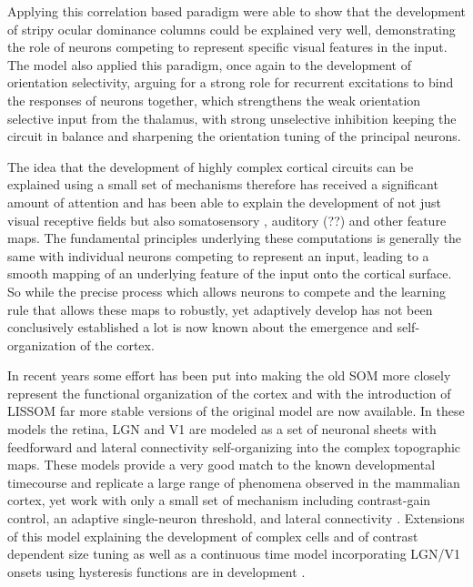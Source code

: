 Applying this correlation based paradigm \cite{Miller1989} were able
to show that the development of stripy ocular dominance columns could
be explained very well, demonstrating the role of neurons competing to
represent specific visual features in the input. The \cite{Sur1995}
model also applied this paradigm, once again to the development of
orientation selectivity, arguing for a strong role for recurrent
excitations to bind the responses of neurons together, which
strengthens the weak orientation selective input from the thalamus,
with strong unselective inhibition keeping the circuit in balance and
sharpening the orientation tuning of the principal neurons.

The idea that the development of highly complex cortical circuits can
be explained using a small set of mechanisms therefore has received a
significant amount of attention and has been able to explain the
development of not just visual receptive fields but also somatosensory
\citep{Wilson2010}, auditory (??) and other feature maps. The
fundamental principles underlying these computations is generally the
same with individual neurons competing to represent an input, leading
to a smooth mapping of an underlying feature of the input onto the
cortical surface. So while the precise process which allows neurons to
compete and the learning rule that allows these maps to robustly, yet
adaptively develop has not been conclusively established a lot is now
known about the emergence and self-organization of the cortex.

In recent years some effort has been put into making the old SOM more
closely represent the functional organization of the cortex and with
the introduction of LISSOM \citep{Bednar2003} far more stable versions
of the original model are now available. In these models the retina,
LGN and V1 are modeled as a set of neuronal sheets with feedforward
and lateral connectivity self-organizing into the complex topographic
maps. These models provide a very good match to the known
developmental timecourse and replicate a large range of phenomena
observed in the mammalian cortex, yet work with only a small set of
mechanism including contrast-gain control, an adaptive single-neuron
threshold, and lateral connectivity \citep{Stevens2013}. Extensions of
this model explaining the development of complex cells and of contrast
dependent size tuning \citep{Antolik2011} as well as a continuous time
model incorporating LGN/V1 onsets using hysteresis functions are in
development \citep{Stevens2011}.

